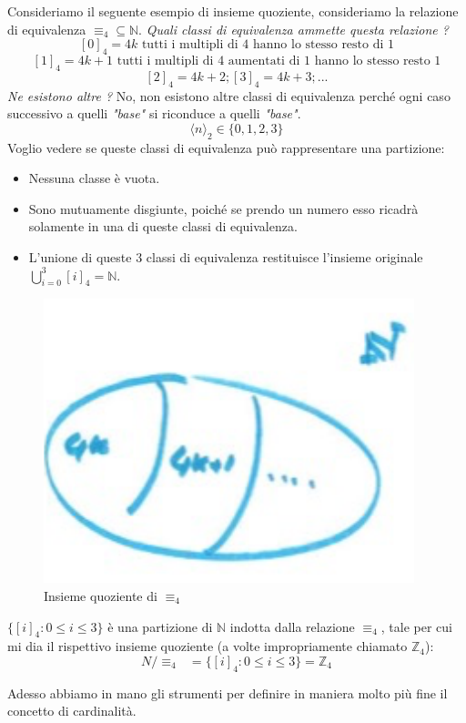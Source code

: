 \documentclass{article}
\begin{document}
Consideriamo il seguente esempio di insieme quoziente, consideriamo la relazione di equivalenza $\equiv_4\subseteq\mathbb{N}$.
\textit{Quali classi di equivalenza ammette questa relazione ?}
$$[0]_4={4k}\text{ tutti i multipli di 4 hanno lo stesso resto di 1}$$
$$[1]_4={4k+1}\text{ tutti i multipli di 4 aumentati di 1 hanno lo stesso resto 1}$$
$$[2]_4={4k+2}; [3]_4={4k+3};...$$
\textit{Ne esistono altre ?} No, non esistono altre classi di equivalenza perché
ogni caso successivo a quelli \textit{"base"} si riconduce a quelli \textit{"base"}.
$$\langle n\rangle_2\in\{0,1,2,3\}$$
Voglio vedere se queste classi di equivalenza può rappresentare una partizione:
\begin{itemize}
    \item Nessuna classe è vuota.
    \item Sono mutuamente disgiunte, poiché se prendo un numero esso ricadrà
          solamente in una di queste classi di equivalenza.
    \item L'unione di queste $3$ classi di equivalenza restituisce l'insieme originale
          $\bigcup\limits_{i=0}^3 [i]_4=\mathbb{N}$.
\end{itemize}
\begin{figure}[H]
    \centering
    \includegraphics[scale=0.4]{images/rel_equi_quot.png}
    \caption{Insieme quoziente di $\equiv_4$}
\end{figure}

$\{[i]_4 : 0\leq i\leq 3\}$ è una partizione di $\mathbb{N}$ indotta dalla relazione
$\equiv_4$, tale per cui mi dia il rispettivo insieme quoziente (a volte impropriamente
chiamato $\mathbb{Z}_4$):
$$N / \equiv_4 \text{ }=\{[i]_4 : 0\leq i\leq 3\}=\mathbb{Z}_4$$

Adesso abbiamo in mano gli strumenti per definire in maniera molto più fine il concetto
di cardinalità.
\end{document}
